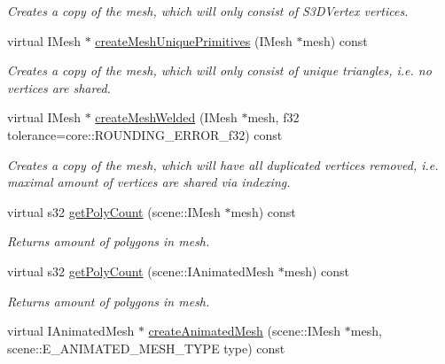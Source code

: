 \begin{DoxyCompactItemize}
\begin{DoxyCompactList}\small\item\em Creates a copy of the mesh, which will only consist of S3\-D\-Vertex vertices. \end{DoxyCompactList}\item 
virtual I\-Mesh $\ast$ \hyperlink{classirr_1_1scene_1_1_c_mesh_manipulator_acf8635e6d499caea68009c3384eb282a}{create\-Mesh\-Unique\-Primitives} (I\-Mesh $\ast$mesh) const 
\begin{DoxyCompactList}\small\item\em Creates a copy of the mesh, which will only consist of unique triangles, i.\-e. no vertices are shared. \end{DoxyCompactList}\item 
virtual I\-Mesh $\ast$ \hyperlink{classirr_1_1scene_1_1_c_mesh_manipulator_a9146c975f669050cc34aef1fd80532fd}{create\-Mesh\-Welded} (I\-Mesh $\ast$mesh, f32 tolerance=core\-::\-R\-O\-U\-N\-D\-I\-N\-G\-\_\-\-E\-R\-R\-O\-R\-\_\-f32) const 
\begin{DoxyCompactList}\small\item\em Creates a copy of the mesh, which will have all duplicated vertices removed, i.\-e. maximal amount of vertices are shared via indexing. \end{DoxyCompactList}\item 
\hypertarget{classirr_1_1scene_1_1_c_mesh_manipulator_ada4f5a994c80d4bf3e5a3ea786300a66}{virtual s32 \hyperlink{classirr_1_1scene_1_1_c_mesh_manipulator_ada4f5a994c80d4bf3e5a3ea786300a66}{get\-Poly\-Count} (scene\-::\-I\-Mesh $\ast$mesh) const }\label{classirr_1_1scene_1_1_c_mesh_manipulator_ada4f5a994c80d4bf3e5a3ea786300a66}

\begin{DoxyCompactList}\small\item\em Returns amount of polygons in mesh. \end{DoxyCompactList}\item 
\hypertarget{classirr_1_1scene_1_1_c_mesh_manipulator_a2b130967c2dd8ec019ff37a63e7aabf0}{virtual s32 \hyperlink{classirr_1_1scene_1_1_c_mesh_manipulator_a2b130967c2dd8ec019ff37a63e7aabf0}{get\-Poly\-Count} (scene\-::\-I\-Animated\-Mesh $\ast$mesh) const }\label{classirr_1_1scene_1_1_c_mesh_manipulator_a2b130967c2dd8ec019ff37a63e7aabf0}

\begin{DoxyCompactList}\small\item\em Returns amount of polygons in mesh. \end{DoxyCompactList}\item 
\hypertarget{classirr_1_1scene_1_1_c_mesh_manipulator_a6d19c37d0d5283011a73ed94884b3a2d}{virtual I\-Animated\-Mesh $\ast$ \hyperlink{classirr_1_1scene_1_1_c_mesh_manipulator_a6d19c37d0d5283011a73ed94884b3a2d}{create\-Animated\-Mesh} (scene\-::\-I\-Mesh $\ast$mesh, scene\-::\-E\-\_\-\-A\-N\-I\-M\-A\-T\-E\-D\-\_\-\-M\-E\-S\-H\-\_\-\-T\-Y\-P\-E type) const }\label{classirr_1_1scene_1_1_c_mesh_manipulator_a6d19c37d0d5283011a73ed94884b3a2d}


\end{DoxyCompactItemize}
